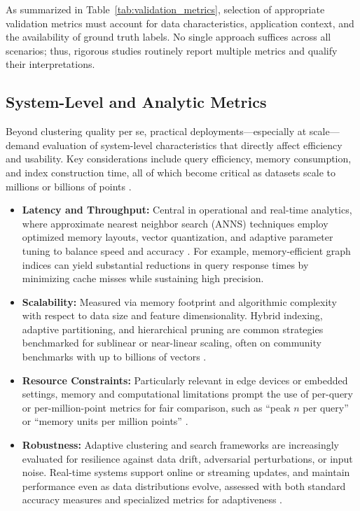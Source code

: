 \documentclass[sigconf]{acmart}
\begin{document}
As summarized in Table~\ref{tab:validation_metrics}, selection of appropriate validation metrics must account for data characteristics, application context, and the availability of ground truth labels. No single approach suffices across all scenarios; thus, rigorous studies routinely report multiple metrics and qualify their interpretations.

\subsection{System-Level and Analytic Metrics}

Beyond clustering quality per se, practical deployments—especially at scale—demand evaluation of system-level characteristics that directly affect efficiency and usability. Key considerations include query efficiency, memory consumption, and index construction time, all of which become critical as datasets scale to millions or billions of points \cite{ref59, ref60, ref64, ref65, ref66, ref67, ref74, ref77, ref78, ref79, ref80, ref81, ref86, ref87, ref106, ref108, ref109, ref110, ref116, ref117, ref118}.

\begin{itemize}
    \item \textbf{Latency and Throughput:} Central in operational and real-time analytics, where approximate nearest neighbor search (ANNS) techniques employ optimized memory layouts, vector quantization, and adaptive parameter tuning to balance speed and accuracy \cite{ref59, ref60, ref109, ref117, ref118}. For example, memory-efficient graph indices can yield substantial reductions in query response times by minimizing cache misses while sustaining high precision.
    \item \textbf{Scalability:} Measured via memory footprint and algorithmic complexity with respect to data size and feature dimensionality. Hybrid indexing, adaptive partitioning, and hierarchical pruning are common strategies benchmarked for sublinear or near-linear scaling, often on community benchmarks with up to billions of vectors \cite{ref59, ref79, ref108, ref116}.
    \item \textbf{Resource Constraints:} Particularly relevant in edge devices or embedded settings, memory and computational limitations prompt the use of per-query or per-million-point metrics for fair comparison, such as ``peak $n$ per query'' or ``memory units per million points'' \cite{ref60, ref79, ref86, ref87}.
    \item \textbf{Robustness:} Adaptive clustering and search frameworks are increasingly evaluated for resilience against data drift, adversarial perturbations, or input noise. Real-time systems support online or streaming updates, and maintain performance even as data distributions evolve, assessed with both standard accuracy measures and specialized metrics for adaptiveness \cite{ref64, ref108, ref110}.
\end{itemize}
\end{document}
